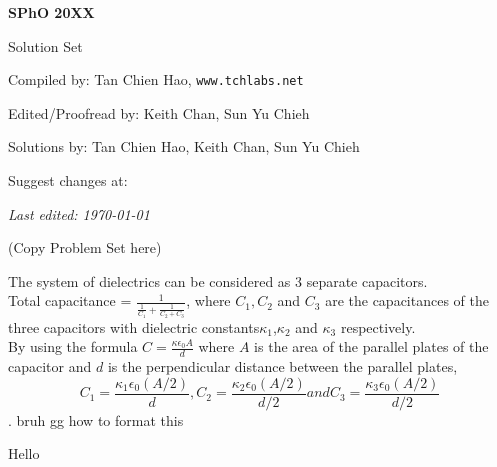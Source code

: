 \def\sphoyear{20XX}
\setcounter{section}{0}
\setcounter{solcounter}{0}

\fancyhead[L]{\textbf{SPhO \sphoyear}} 


\begin{titlepage}
\centering

{\Huge\bfseries SPhO \sphoyear}

\vspace{1cm}

{\LARGE Solution Set}

\vspace{2cm}

{\Large Compiled by: Tan Chien Hao, \texttt{www.tchlabs.net}}

\vspace{2cm}

{\Large Edited/Proofread by: Keith Chan, Sun Yu Chieh}

\vspace{2cm}

{\Large Solutions by: Tan Chien Hao, Keith Chan, Sun Yu Chieh}

\vspace{2cm}

{\large Suggest changes at: \github}


\vfill

{\itshape Last edited: \today}
\end{titlepage}

(Copy Problem Set here)

\begin{solution}
    \begin{subsolution}
        The system of dielectrics can be considered as 3 separate capacitors.\\
        Total capacitance = $\frac{1}{\frac{1}{C_1}+\frac{1}{C_2+C_3}}$, where $C_1,C_2$ and $C_3$ are the capacitances of the three capacitors with dielectric constants$\kappa_1$,$\kappa_2$ and $\kappa_3$ respectively.\\
        By using the formula $C=\frac{\kappa\epsilon_0A}{d}$ where $A$ is the area of the parallel plates of the capacitor and $d$ is the perpendicular distance between the parallel plates, \\$$C_1=\frac{\kappa_1\epsilon_0(A/2)}{d}, C_2=\frac{\kappa_2\epsilon_0(A/2)}{d/2} and C_3=\frac{\kappa_3\epsilon_0(A/2)}{d/2}$$.
        bruh gg how to format this
        
        
        \end{subsolution}
    \begin{subsolution}
        Hello
    \end{subsolution}
\end{solution}